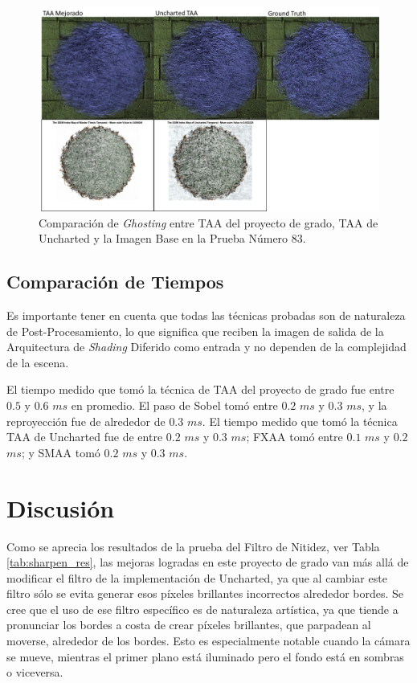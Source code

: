 \documentclass[pregrado]{tesis-usb} %
\begin{document}
\begin{figure}[!htb]
	\centering
	\includegraphics[scale=0.4]{images/results/hairball_ghosting_lighted.png}
	\caption{Comparación de \textit{Ghosting} entre TAA del proyecto de grado, TAA de Uncharted y la Imagen Base en la Prueba Número 83.}\label{fig:hairball_ghosting_lighted}
\end{figure}

\FloatBarrier
\subsection{Comparación de Tiempos} \label{result_timing}
Es importante tener en cuenta que todas las técnicas probadas son de naturaleza de Post-Procesamiento, lo que significa que reciben la imagen de salida de la Arquitectura de \textit{Shading} Diferido como entrada y no dependen de la complejidad de la escena.

El tiempo medido que tomó la técnica de TAA del proyecto de grado fue entre $0.5$ y $0.6$ $ms$ en promedio. El paso de Sobel tomó entre $0.2$ $ms$ y $0.3$ $ms$, y la reproyección fue de alrededor de $0.3$ $ms$. El tiempo medido que tomó la técnica TAA de Uncharted fue de entre $0.2$ $ms$ y $0.3$ $ms$; FXAA tomó entre $0.1$ $ms$ y $0.2$ $ms$; y SMAA tomó $0.2$ $ms$ y $0.3$ $ms$.


\section{Discusión}
Como se aprecia los resultados de la prueba del Filtro de Nitidez, ver Tabla \ref{tab:sharpen_res}, las mejoras logradas en este proyecto de grado van más allá de modificar el filtro de la implementación de Uncharted, ya que al cambiar este filtro sólo se evita generar esos píxeles brillantes incorrectos alrededor bordes. Se cree que el uso de ese filtro específico es de naturaleza artística, ya que tiende a pronunciar los bordes a costa de crear píxeles brillantes, que parpadean al moverse, alrededor de los bordes. Esto es especialmente notable cuando la cámara se mueve, mientras el primer plano está iluminado pero el fondo está en sombras o viceversa.
\end{document}
